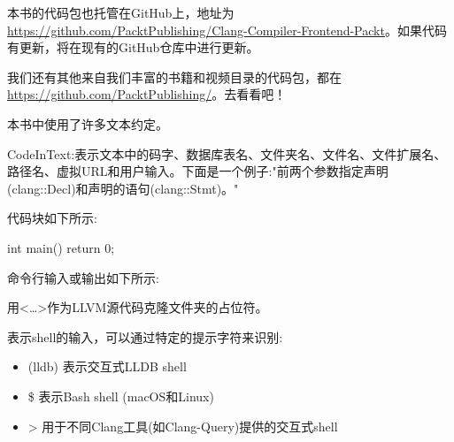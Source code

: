 
本书的代码包也托管在GitHub上，地址为 \url{https://github.com/PacktPublishing/Clang-Compiler-Frontend-Packt}。如果代码有更新，将在现有的GitHub仓库中进行更新。

我们还有其他来自我们丰富的书籍和视频目录的代码包，都在 \url{https://github.com/PacktPublishing/}。去看看吧！



本书中使用了许多文本约定。

​CodeInText:表示文本中的码字、数据库表名、文件夹名、文件名、文件扩展名、路径名、虚拟URL和用户输入。下面是一个例子:"前两个参数指定声明(clang::Decl)和声明的语句(clang::Stmt)。"

代码块如下所示:

\begin{cpp}
int main() {
  return 0;
}
\end{cpp}

命令行输入或输出如下所示:


用<…>作为LLVM源代码克隆文件夹的占位符。

表示shell的输入，可以通过特定的提示字符来识别:

\begin{itemize}
\item
(lldb) 表示交互式LLDB shell

\item
\$ 表示Bash shell (macOS和Linux)

\item
> 用于不同Clang工具(如Clang-Query)提供的交互式shell
\end{itemize}




